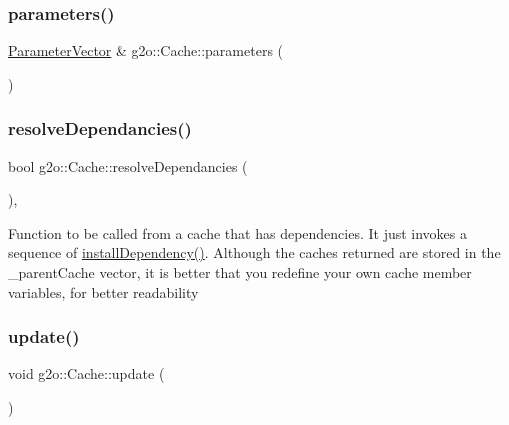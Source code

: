 \mbox{\label{classg2o_1_1_cache_a16e471be92f9fe24a3abdf11a0c546d2}} 
\subsubsection{\texorpdfstring{parameters()}{parameters()}}
{\footnotesize\ttfamily \mbox{\hyperlink{namespaceg2o_a85cc8f2c7db8cab47b2b269a7acd6785}{Parameter\+Vector}} \& g2o\+::\+Cache\+::parameters (\begin{DoxyParamCaption}{ }\end{DoxyParamCaption})}

\mbox{\label{classg2o_1_1_cache_a0c26f0baa33a5902002f1ca2d5f57ece}} 
\subsubsection{\texorpdfstring{resolve\+Dependancies()}{resolveDependancies()}}
{\footnotesize\ttfamily bool g2o\+::\+Cache\+::resolve\+Dependancies (\begin{DoxyParamCaption}{ }\end{DoxyParamCaption})\hspace{0.3cm}{\ttfamily [protected]}, {\ttfamily [virtual]}}

Function to be called from a cache that has dependencies. It just invokes a sequence of \mbox{\hyperlink{classg2o_1_1_cache_a776574fb98726ff61bc1280ea624c6e5}{install\+Dependency()}}. Although the caches returned are stored in the \+\_\+parent\+Cache vector, it is better that you redefine your own cache member variables, for better readability \mbox{\label{classg2o_1_1_cache_aaea446a5eb59569acc67c94793975a0b}} 
\subsubsection{\texorpdfstring{update()}{update()}}
{\footnotesize\ttfamily void g2o\+::\+Cache\+::update (\begin{DoxyParamCaption}{ }\end{DoxyParamCaption})}

